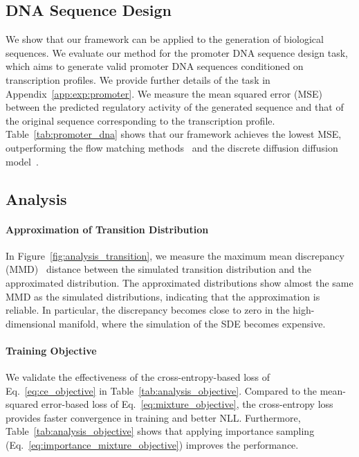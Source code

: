 \subsection{DNA Sequence Design}
We show that our framework can be applied to the generation of biological sequences. We evaluate our method for the promoter DNA sequence design task, which aims to generate valid promoter DNA sequences conditioned on transcription profiles.
We provide further details of the task in Appendix~\ref{app:exp:promoter}.
We measure the mean squared error (MSE) between the predicted regulatory activity of the generated sequence and that of the original sequence corresponding to the transcription profile.
Table~\ref{tab:promoter_dna} shows that our framework achieves the lowest MSE, outperforming the flow matching methods~\citep{stark2024dirichlet,davis2024fisherflow} and the discrete diffusion diffusion model~\citep{austin2021d3pm}.



\subsection{Analysis}

\paragraph{Approximation of Transition Distribution} \label{exp:transition}
In Figure~\ref{fig:analysis_transition}, we measure the maximum mean discrepancy (MMD)~\citep{gretton2012kernel} distance between the simulated transition distribution and the approximated distribution. 
The approximated distributions show almost the same MMD as the simulated distributions, indicating that the approximation is reliable. 
In particular, the discrepancy becomes close to zero in the high-dimensional manifold, where the simulation of the SDE becomes expensive.





\paragraph{Training Objective} \label{exp:objective}
We validate the effectiveness of the cross-entropy-based loss of Eq.~\eqref{eq:ce_objective} in Table~\ref{tab:analysis_objective}. 
Compared to the mean-squared error-based loss of Eq.~\eqref{eq:mixture_objective}, the cross-entropy loss provides faster convergence in training and better NLL.
Furthermore, Table~\ref{tab:analysis_objective} shows that applying importance sampling (Eq.~\eqref{eq:importance_mixture_objective}) improves the performance.


